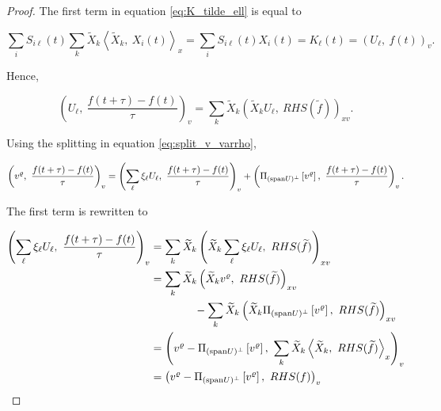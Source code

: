 \begin{proof}
    The first term in equation \ref{eq:K_tilde_ell} is equal to 

    \begin{equation}
        \sum_i S_{i \ell} (t) \sum_k 
            \widetilde{ X }_k \left\langle \widetilde{ X }_k,\ X_i (t) \right\rangle_x
        = \sum_i S_{i \ell} (t) X_i (t) 
        = K_\ell (t) 
        = \left( U_\ell,\ f(t) \right)_v . 
    \end{equation}

    Hence, 

    \begin{equation}
        \left( U_\ell,\ \frac{f(t + \tau) - f(t)}{\tau} \right)_v
        = \sum_k \widetilde{ X }_k 
        \left( \widetilde{ X }_k U_\ell,\ RHS (\widetilde{ f }) \right)_{x v} . 
    \end{equation}

    Using the splitting in equation \ref{eq:split_v_varrho}, 

    \begin{equation}\label{eq:continuity_finite_diff_part}
        \left( v^\varrho,\ \frac{f(t + \tau) - f(t)}{\tau} \right)_v
        = \left( \sum_\ell \xi_\ell U_\ell,\ \frac{f(t + \tau) - f(t)}{\tau} \right)_v
            + \left( \Pi_{(\spn U)^\perp} \left[ v^\varrho \right],\ 
            \frac{f(t + \tau) - f(t)}{\tau} \right)_v . 
    \end{equation}

    The first term is rewritten to 

    \begin{equation}\label{eq:continuity_U_part}
        \begin{split}
            \left( \sum_\ell \xi_\ell U_\ell,\ \frac{f(t + \tau) - f(t)}{\tau} \right)_v
            &= \sum_k \widetilde{ X }_k \left( 
                \widetilde{ X }_k \sum_\ell \xi_\ell U_\ell,\ 
                RHS(\widetilde{ f }) 
            \right)_{x v} \\ 
            &= \sum_k \widetilde{ X }_k 
                \left( \widetilde{ X }_k v^\varrho,\ RHS (\widetilde{ f }) \right)_{x v} \\
                &\quad\quad\quad\quad
                - \sum_k \widetilde{ X }_k \left( \widetilde{ X }_k \Pi_{(\spn U)^\perp} \left[ v^\varrho \right],\ 
                RHS( \widetilde{ f } ) \right)_{x v} \\ 
            &= \left( 
                v^\varrho - \Pi_{(\spn U)^\perp} \left[ v^\varrho \right],\ 
                \sum_k \widetilde{ X }_k \left\langle \widetilde{ X }_k,\ RHS(\widetilde{ f }) \right\rangle_x
             \right)_v \\ 
            &= \left( v^\varrho - \Pi_{(\spn U)^\perp} \left[ v^\varrho \right],\ RHS(f) \right)_v 
        \end{split}
    \end{equation}


\end{proof}
